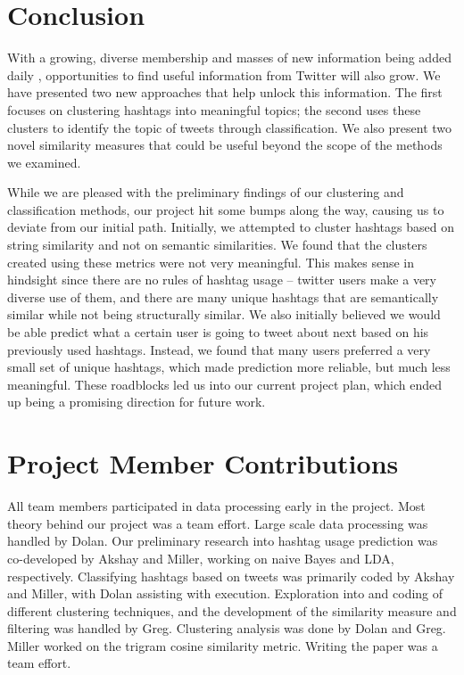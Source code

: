 \section{Conclusion}
With a growing, diverse membership and masses of new information being added daily \cite{Holt2011}, opportunities to find useful information from Twitter will also grow. We have presented two new approaches that help unlock this information. The first focuses on clustering hashtags into meaningful topics; the second uses these clusters to identify the topic of tweets through classification. We also present two novel similarity measures that could be useful beyond the scope of the methods we examined. 

While we are pleased with the preliminary findings of our clustering and classification methods, our project hit some bumps along the way, causing us to deviate from our initial path. Initially, we attempted to cluster hashtags based on string similarity and not on semantic similarities. We found that the clusters created using these metrics were not very meaningful. This makes sense in hindsight since there are no rules of hashtag usage -- twitter users make a very diverse use of them, and there are many unique hashtags that are semantically similar while not being structurally similar. We also initially believed we would be able predict what a certain user is going to tweet about next based on his previously used hashtags. Instead, we found that many users preferred a very small set of unique hashtags, which made prediction more reliable, but much less meaningful. These roadblocks led us into our current project plan, which ended up being a promising direction for future work.


\section{Project Member Contributions}
All team members participated in data processing early in the project.  Most theory behind our project was a team effort.  Large scale data processing was handled by Dolan. Our preliminary research into hashtag usage prediction was co-developed by Akshay and Miller, working on naive Bayes and LDA, respectively.  Classifying hashtags based on tweets was primarily coded by Akshay and Miller, with Dolan assisting with execution. Exploration into and coding of different clustering techniques, and the development of the similarity measure and filtering was handled by Greg. Clustering analysis was done by Dolan and Greg. Miller worked on the trigram cosine similarity metric. Writing the paper was a team effort.